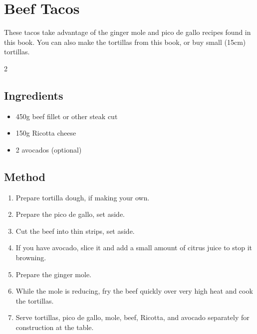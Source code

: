 \clearpage
\section{Beef Tacos}


  These tacos take advantage of the ginger mole and pico de gallo recipes found in this book. You can also make the tortillas from this book, or buy small (15cm) tortillas.
  \begin{multicols}{2}
    \subsection{Ingredients}
      \begin{itemize}
        \item 450g beef fillet or other steak cut
        \item 150g Ricotta cheese
        \item 2 avocados (optional)
      \end{itemize}
  \vfill\null
  \columnbreak
  \subsection{Method}
    \begin{enumerate}
      \item Prepare tortilla dough, if making your own.
      \item Prepare the pico de gallo, set aside.
      \item Cut the beef into thin strips, set aside.
      \item If you have avocado, slice it and add a small amount of citrus juice to stop it browning.
      \item Prepare the ginger mole.
      \item While the mole is reducing, fry the beef quickly over very high heat and cook the tortillas.
      \item Serve tortillas, pico de gallo, mole, beef, Ricotta, and avocado separately for construction at the table.
    \end{enumerate}
  \end{multicols}
